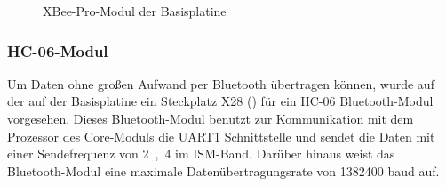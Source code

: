 \begin{figure}[H]
    \centering
    \qquad
    \qquad
    \caption[XBee-Pro-Modul der Basisplatine]{XBee-Pro-Modul der \gls{Basisplatine}}
    \label{fig:basisplatine-xbee}
\end{figure}

\subsubsection{HC-06-Modul \cite{basis:hc06}}
Um Daten ohne großen Aufwand per Bluetooth übertragen können, wurde auf der auf der \gls{Basisplatine} ein Steckplatz X28 () für ein HC-06 Bluetooth-Modul vorgesehen. Dieses Bluetooth-Modul benutzt zur Kommunikation mit dem Prozessor des \gls{Core-Modul}s die UART1 Schnittstelle und sendet die Daten mit einer Sendefrequenz von \unit{2,4}{\giga\hertz} im ISM-Band. Darüber hinaus weist das Bluetooth-Modul eine maximale Datenübertragungsrate von 1382400 baud auf.


